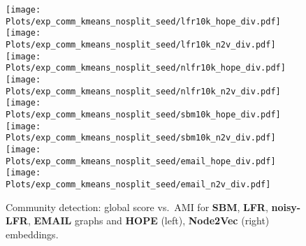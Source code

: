 \clearpage

%
\begin{figure}[ht]
    \centering
    \texttt{[image: Plots/exp\_comm\_kmeans\_nosplit\_seed/lfr10k\_hope\_div.pdf]}
        \hspace{.1cm}
    \texttt{[image: Plots/exp\_comm\_kmeans\_nosplit\_seed/lfr10k\_n2v\_div.pdf]}
    \vspace{.1cm}
    \texttt{[image: Plots/exp\_comm\_kmeans\_nosplit\_seed/nlfr10k\_hope\_div.pdf]}
        \hspace{.1cm}
    \texttt{[image: Plots/exp\_comm\_kmeans\_nosplit\_seed/nlfr10k\_n2v\_div.pdf]}
    \vspace{.1cm}
    \texttt{[image: Plots/exp\_comm\_kmeans\_nosplit\_seed/sbm10k\_hope\_div.pdf]}
        \hspace{.1cm}
    \texttt{[image: Plots/exp\_comm\_kmeans\_nosplit\_seed/sbm10k\_n2v\_div.pdf]}
    \vspace{.1cm}
    \texttt{[image: Plots/exp\_comm\_kmeans\_nosplit\_seed/email\_hope\_div.pdf]}
        \hspace{.1cm}
    \texttt{[image: Plots/exp\_comm\_kmeans\_nosplit\_seed/email\_n2v\_div.pdf]}
    \caption{Community detection: global score vs.\ AMI for \textbf{SBM}, \textbf{LFR}, \textbf{noisy-LFR}, \textbf{EMAIL} graphs and \textbf{HOPE} (left), \textbf{Node2Vec} (right) embeddings.}
    \label{fig:10kkmeans}
\end{figure}

